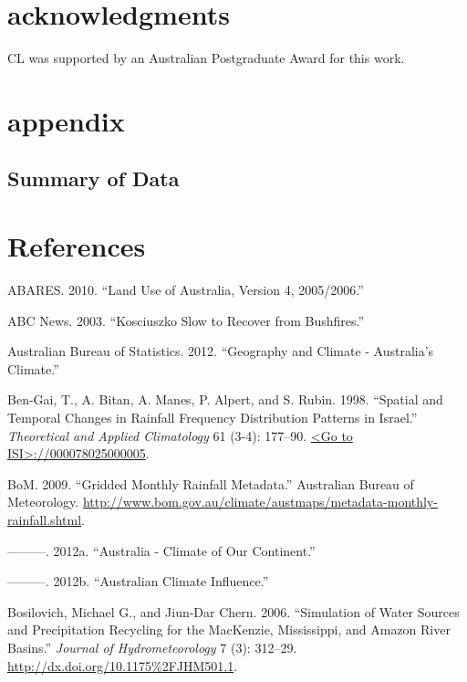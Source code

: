 \documentclass[]{elsarticle} %
\theoremstyle{definition}
\theoremstyle{definition}
\theoremstyle{definition}
\theoremstyle{remark}
\begin{document}
\section{acknowledgments}\label{acknowledgments}

CL was supported by an Australian Postgraduate Award for this work.

\newpage

\section{appendix}\label{appendix}

\subsection{Summary of Data}\label{summary-of-data}

\newpage

\section*{References}\label{references}

\hypertarget{refs}{}
\hypertarget{ref-ABARES2010}{}
ABARES. 2010. ``Land Use of Australia, Version 4, 2005/2006.''

\hypertarget{ref-ABC2003}{}
ABC News. 2003. ``Kosciuszko Slow to Recover from Bushfires.''

\hypertarget{ref-ABS2012}{}
Australian Bureau of Statistics. 2012. ``Geography and Climate -
Australia's Climate.''

\hypertarget{ref-Ben-Gai1998}{}
Ben-Gai, T., A. Bitan, A. Manes, P. Alpert, and S. Rubin. 1998.
``Spatial and Temporal Changes in Rainfall Frequency Distribution
Patterns in Israel.'' \emph{Theoretical and Applied Climatology} 61
(3-4): 177--90.
\href{\%3CGo\%20to\%20ISI\%3E://000078025000005}{\textless{}Go to ISI\textgreater{}://000078025000005}.

\hypertarget{ref-BoM2009}{}
BoM. 2009. ``Gridded Monthly Rainfall Metadata.'' Australian Bureau of
Meteorology.
\url{http://www.bom.gov.au/climate/austmaps/metadata-monthly-rainfall.shtml}.

\hypertarget{ref-BoM2012a}{}
---------. 2012a. ``Australia - Climate of Our Continent.''

\hypertarget{ref-BoM2012}{}
---------. 2012b. ``Australian Climate Influence.''

\hypertarget{ref-Bosilovich2006}{}
Bosilovich, Michael G., and Jiun-Dar Chern. 2006. ``Simulation of Water
Sources and Precipitation Recycling for the MacKenzie, Mississippi, and
Amazon River Basins.'' \emph{Journal of Hydrometeorology} 7 (3):
312--29. \url{http://dx.doi.org/10.1175\%2FJHM501.1}.
\end{document}
